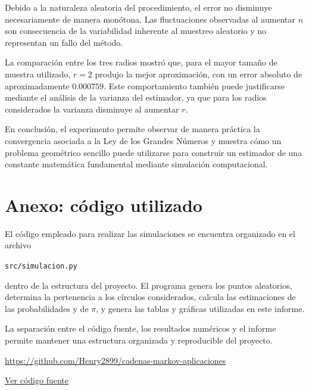 \documentclass[12pt,a4paper]{article}
\begin{document}
Debido a la naturaleza aleatoria del procedimiento, el error no
disminuye necesariamente de manera monótona. Las fluctuaciones
observadas al aumentar \(n\) son consecuencia de la variabilidad
inherente al muestreo aleatorio y no representan un fallo del método.

La comparación entre los tres radios mostró que, para el mayor tamaño
de muestra utilizado, \(r=2\) produjo la mejor aproximación, con un
error absoluto de aproximadamente \(0.000759\). Este comportamiento
también puede justificarse mediante el análisis de la varianza del
estimador, ya que para los radios considerados la varianza disminuye
al aumentar \(r\).

En conclusión, el experimento permite observar de manera práctica la
convergencia asociada a la Ley de los Grandes Números y muestra cómo
un problema geométrico sencillo puede utilizarse para construir un
estimador de una constante matemática fundamental mediante simulación
computacional.


\section{Anexo: código utilizado}

El código empleado para realizar las simulaciones se encuentra
organizado en el archivo

\begin{center}
\texttt{src/simulacion.py}
\end{center}


dentro de la estructura del proyecto. El programa genera los puntos
aleatorios, determina la pertenencia a los círculos considerados,
calcula las estimaciones de las probabilidades y de \(\pi\), y genera
las tablas y gráficas utilizadas en este informe.

La separación entre el código fuente, los resultados numéricos y el
informe permite mantener una estructura organizada y reproducible del
proyecto.

\url{https://github.com/Henry2899/cadenas-markov-aplicaciones}

\href{https://github.com/Henry2899/cadenas-markov-aplicaciones/blob/main/tarea-01-monte-carlo/src/simulacion.py}{Ver código fuente}
\end{document}
